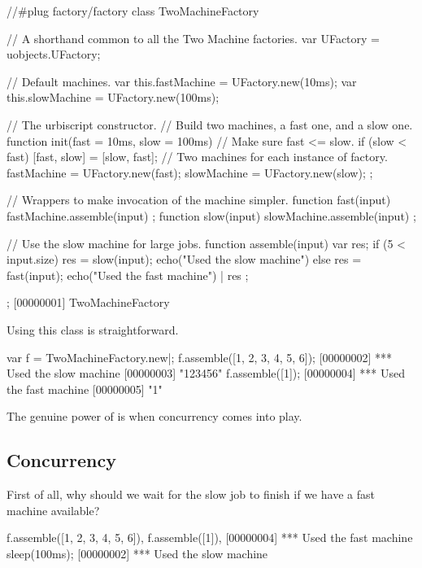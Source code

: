 \begin{urbiscript}[firstnumber=1]
//#plug factory/factory
class TwoMachineFactory
{
  // A shorthand common to all the Two Machine factories.
  var UFactory = uobjects.UFactory;

  // Default machines.
  var this.fastMachine = UFactory.new(10ms);
  var this.slowMachine = UFactory.new(100ms);

  // The urbiscript constructor.
  // Build two machines, a fast one, and a slow one.
  function init(fast = 10ms, slow = 100ms)
  {
    // Make sure fast <= slow.
    if (slow < fast)
      [fast, slow] = [slow, fast];
    // Two machines for each instance of factory.
    fastMachine = UFactory.new(fast);
    slowMachine = UFactory.new(slow);
  };

  // Wrappers to make invocation of the machine simpler.
  function fast(input) { fastMachine.assemble(input) };
  function slow(input) { slowMachine.assemble(input) };

  // Use the slow machine for large jobs.
  function assemble(input)
  {
    var res;
    if (5 < input.size)
      { res = slow(input); echo("Used the slow machine") }
    else
      { res = fast(input); echo("Used the fast machine") } |
    res
  };
};
[00000001] TwoMachineFactory
\end{urbiscript}

Using this class is straightforward.

\begin{urbiscript}
var f = TwoMachineFactory.new|;
f.assemble([1, 2, 3, 4, 5, 6]);
[00000002] *** Used the slow machine
[00000003] "123456"
f.assemble([1]);
[00000004] *** Used the fast machine
[00000005] "1"
\end{urbiscript}

The genuine power of \us is when concurrency comes into play.

\subsection{Concurrency}
%
%
%

First of all, why should we wait for the slow job to finish if we have
a fast machine available?

\begin{urbiscript}
f.assemble([1, 2, 3, 4, 5, 6]),
f.assemble([1]),
[00000004] *** Used the fast machine
sleep(100ms);
[00000002] *** Used the slow machine
\end{urbiscript}

